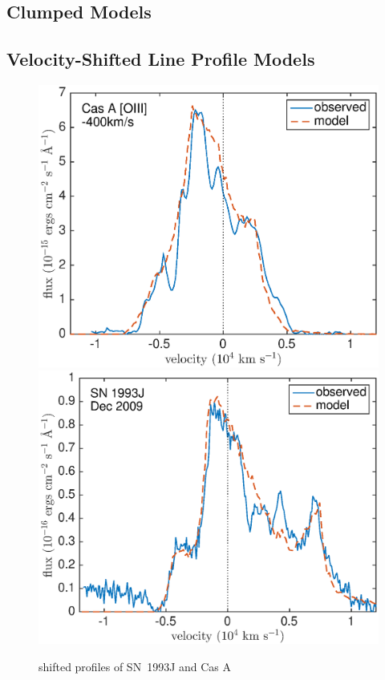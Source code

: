 \subsection{Clumped Models}



\subsection{Velocity-Shifted Line Profile Models}

\begin{figure}
\centering
\includegraphics[scale=0.4,clip=true, trim=20 0 40 20]{chapters/chapter6/figs/CasA/CasA_OIII_v400shift}
\includegraphics[scale=0.4,clip=true, trim=20 0 40 20]{chapters/chapter6/figs/93J/smooth/OIII_shifted_0_3}
\caption{shifted profiles of SN~1993J and Cas A}
\label{shifted}
\end{figure}


